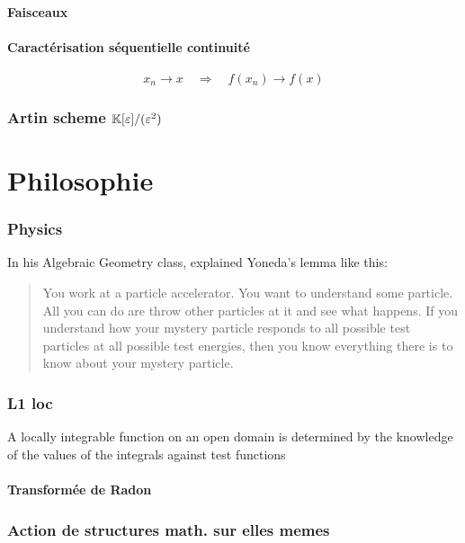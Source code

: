 \documentclass[12pt,makeidx, draft]{amsart}
\begin{document}
\subsection{Faisceaux}

\subsection{Caractérisation séquentielle continuité}
\[
x_n \to x
\quad \Rightarrow\quad
f(x_n) \to f(x)
\]
\section{Artin scheme $\mathbb{K}[\varepsilon]/(\varepsilon^2)$}

\part{Philosophie}

\section{Physics}
In his Algebraic Geometry class,  explained Yoneda's lemma like this: 
\begin{quote}
You work at a particle accelerator. You want to understand some particle. All you can do are throw other particles at it and see what happens. If you understand how your mystery particle responds to all possible test particles at all possible test energies, then you know everything there is to know about your mystery particle.
\end{quote}

\section{L1 loc}



A locally integrable function on an open domain is determined by the knowledge of the values of the integrals against test functions


\subsection{Transformée de Radon}

\section{Action de structures math. sur elles memes}
\end{document}
